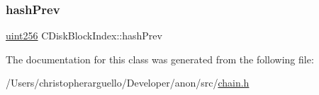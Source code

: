 \subsubsection{\texorpdfstring{hash\+Prev}{hashPrev}}
{\footnotesize\ttfamily \mbox{\hyperlink{classuint256}{uint256}} C\+Disk\+Block\+Index\+::hash\+Prev}



The documentation for this class was generated from the following file\+:\begin{DoxyCompactItemize}
\item 
/\+Users/christopherarguello/\+Developer/anon/src/\mbox{\hyperlink{chain_8h}{chain.\+h}}\end{DoxyCompactItemize}
